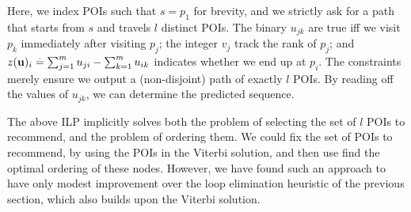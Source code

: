 \vspace{0.5\baselineskip}

Here, we index POIs such that $s = p_1$ for brevity,
and we strictly ask for a path that starts from $s$ and travels $l$ distinct POIs.
The binary $u_{jk}$ are true iff
we visit $p_k$ immediately after visiting $p_j$;
the integer $v_j$ track the rank of $p_j$;
and $z(\mathbf{u})_i \stackrel{.}{=} \sum_{j=1}^m u_{ji} - \sum_{k=1}^m u_{ik}$ indicates whether we end up at $p_i$.
The constraints merely ensure we output a (non-disjoint) path of exactly $l$ POIs.
By reading off the values of $u_{jk}$, we can determine the predicted sequence.

The above ILP implicitly solves both the problem of selecting the set of $l$ POIs to recommend,
and the problem of ordering them.
We could fix the set of POIs to recommend, \eg by using the POIs in the Viterbi solution, and then use find the optimal ordering of these nodes.
However, we have found such an approach to have only modest improvement over the loop elimination heuristic of the previous section, which also builds upon the Viterbi solution.
